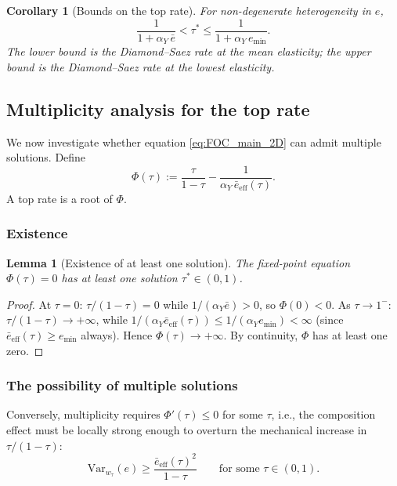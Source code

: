 \documentclass[12pt,a4paper]{article}
\theoremstyle{definition}
\theoremstyle{plain}
\newtheorem{lemma}{Lemma}[section]
\newtheorem{corollary}{Corollary}[section]
\theoremstyle{remark}
\begin{document}
\begin{corollary}[Bounds on the top rate]
\label{cor:2D_bounds}
For non-degenerate heterogeneity in $e$,
\begin{equation}
\label{eq:tau_bounds}
  \frac{1}{1+\alpha_Y\,\bar{e}} < \tau^* \leq \frac{1}{1+\alpha_Y\,e_{\min}}.
\end{equation}
The lower bound is the Diamond--Saez rate at the mean elasticity; the upper bound is the Diamond--Saez rate at the lowest elasticity.
\end{corollary}


\subsection{Multiplicity analysis for the top rate}
\label{sec:2D_multiplicity}

We now investigate whether equation \eqref{eq:FOC_main_2D} can admit multiple solutions.  Define
\[
  \Phi(\tau) := \frac{\tau}{1-\tau} - \frac{1}{\alpha_Y\,\bar{e}_{\mathrm{eff}}(\tau)}.
\]
A top rate is a root of $\Phi$.

\subsubsection{Existence}

\begin{lemma}[Existence of at least one solution]
\label{lem:2D_existence}
The fixed-point equation $\Phi(\tau) = 0$ has at least one solution $\tau^* \in (0,1)$.
\end{lemma}

\begin{proof}
At $\tau = 0$: $\tau/(1-\tau) = 0$ while $1/(\alpha_Y\bar{e}) > 0$, so $\Phi(0) < 0$.  As $\tau \to 1^-$: $\tau/(1-\tau) \to +\infty$, while $1/(\alpha_Y\bar{e}_{\mathrm{eff}}(\tau)) \leq 1/(\alpha_Y e_{\min}) < \infty$ (since $\bar{e}_{\mathrm{eff}}(\tau) \geq e_{\min}$ always).  Hence $\Phi(\tau) \to +\infty$.  By continuity, $\Phi$ has at least one zero.
\end{proof}

\subsubsection{The possibility of multiple solutions}

Conversely, multiplicity requires $\Phi'(\tau) \leq 0$ for some $\tau$, i.e., the composition effect must be locally strong enough to overturn the mechanical increase in $\tau/(1-\tau)$:
\begin{equation}
\label{eq:multiplicity_necessary}
  \mathrm{Var}_{w_\tau}(e) \geq \frac{\bar{e}_{\mathrm{eff}}(\tau)^2}{1-\tau} \qquad \text{for some } \tau \in (0,1).
\end{equation}
\end{document}

